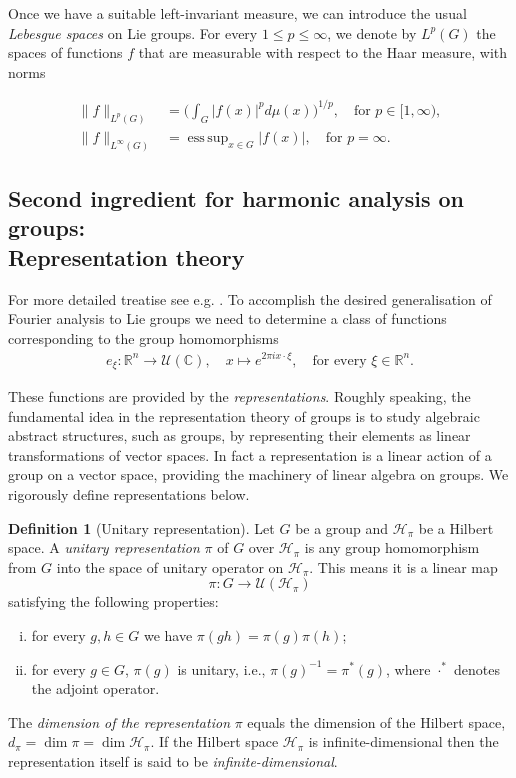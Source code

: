 \documentclass[12pt,oneside,a4paper]{book}
\numberwithin{equation}{section}     %
\theoremstyle{plain}
\theoremstyle{definition}
\newtheorem{definition}[theorem]{Definition}
\DeclareMathOperator*{\esssup}{ess\,sup}
\newcommand{\C}{{\mathbb C}}
\newcommand{\R}{{\mathbb R}}
\newcommand{\Rn}{{\R}^n}
\begin{document}
Once we have a suitable left-invariant measure, we can introduce the usual \textit{Lebesgue spaces} on Lie groups. For every $1\leq p\leq \infty$, we denote by $L^p(G)$ the spaces of functions $f$ that are measurable with respect to the Haar measure, with norms

\begin{align*}
\|f\|_{L^p(G)}&=\Bigg(\int_G |f(x)|^p d\mu(x)\Bigg)^{1/p},\quad\text{for }p\in[1,\infty),\\
\|f\|_{L^\infty(G)}&=\esssup_{x\in G}|f(x)|,\quad\text{for }p=\infty.
\end{align*}

\subsection{Second ingredient for harmonic analysis on groups:\\ Representation theory}

For more detailed treatise see e.g. \cite{F1994,FR2016,H2003,R2014,RT2009}.
To accomplish the desired generalisation of Fourier analysis to Lie groups we need to determine a class of functions corresponding to the group homomorphisms 
\begin{align*}
e_\xi:\Rn\rightarrow \mathcal{U}(\C),\quad x\mapsto e^{2\pi i x\cdot \xi},\quad \text{for every }{\xi\in\Rn}.
\end{align*}

These functions are provided by the \textit{representations}. Roughly speaking, the fundamental idea in the representation theory of groups is to study algebraic abstract structures, such as groups, by representing their elements as linear transformations of vector spaces. In fact a representation is a linear action of a group on a vector space, providing the machinery of linear algebra on groups. We rigorously define representations below.

\begin{definition}[Unitary representation]
	Let $G$ be a group and $\mathcal H_\pi$ be a Hilbert space. A \textit{unitary representation} $\pi$ of $G$ over $\mathcal H_\pi$ is any group homomorphism from $G$ into the space of unitary operator on $\mathcal H_\pi$. This means it is a linear map
	\[
	\pi:G\rightarrow \mathcal{U}(\mathcal{H}_\pi)
	\]
	satisfying the following properties:
	\begin{enumerate}[i.]
		\item for every $g,h\in G$ we have $\pi(gh)=\pi(g)\pi(h)$;
		\item for every $g\in G$, $\pi(g)$ is unitary, i.e., $\pi(g)^{-1}=\pi^*(g)$, where $\cdot^*$ denotes the adjoint operator.
	\end{enumerate}
	The \textit{dimension of the representation} $\pi$ equals the dimension of the Hilbert space, $d_\pi=\dim \pi=\dim \mathcal{H}_\pi$. If the Hilbert space $\mathcal{H}_\pi$ is infinite-dimensional then the representation itself is said to be \textit{infinite-dimensional}.
\end{definition}
\end{document}
